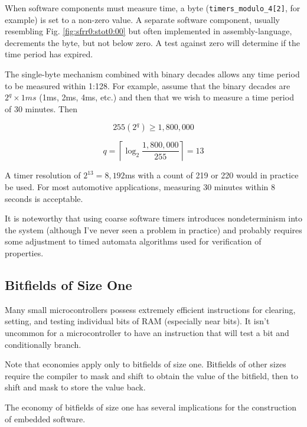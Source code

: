 \documentclass[letterpaper,10pt,titlepage]{article}
\begin{document}
When software components must measure time, a byte
(\texttt{timers\_modulo\_4[2]}, for example) is set to a non-zero value.
A separate software component, usually resembling Fig. \ref{fig:sfrr0:stot0:00} but often
implemented in assembly-language,
decrements the byte, but not below zero.
A test against zero will determine if the time period has expired.

The single-byte mechanism combined with binary decades allows any time period
to be measured within 1:128.  For example, assume that the binary decades are
$2^q \times 1ms$ (1ms, 2ms, 4ms, etc.) and then that
we wish to measure a time period of 30 minutes.  Then

\begin{equation}
255 (2^q) \geq 1,800,000
\end{equation}

\begin{equation}
q = \left\lceil \log_2 \frac{1,800,000}{255} \right\rceil = 13
\end{equation}

A timer resolution of $2^{13} = 8,192$ms with a count of 219 or 220 would in practice be used.
For most automotive applications, measuring 30 minutes within 8 seconds is acceptable.

It is noteworthy that using coarse software timers introduces nondeterminism
into the system (although I've never seen a problem in practice) and probably requires
some adjustment to timed automata algorithms used for verification of properties.



\subsection{Bitfields of Size One}
\label{sfrr0:sbfi0}

Many small microcontrollers possess extremely efficient instructions
for clearing, setting, and testing individual bits of RAM (especially near
bits).  It isn't uncommon for a microcontroller to have an instruction that
will test a bit and conditionally branch.

Note that economies apply only to bitfields of size one.  Bitfields of
other sizes require the compiler to mask and shift to obtain the value of the
bitfield, then to shift and mask to store the value back.

The economy of bitfields of size one has several implications for the construction 
of embedded software.
\end{document}
